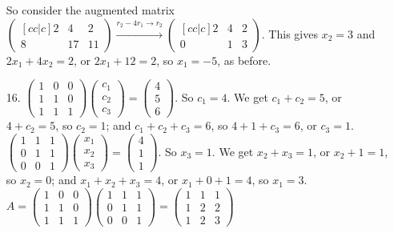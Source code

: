 \documentclass[11pt,twoside]{article}
\newcommand{\makearrow}[2]{\overset{#1}{\underset{#2}{\xrightarrow{\hspace{2cm}}}}}
\newcommand{\bpm}{\begin{pmatrix}}
\newcommand{\epm}{\end{pmatrix}}
\begin{document}
\begin{enumerate}
So consider the augmented matrix $\bpm[cc|c]2 & 4 & 2\\ 8 & 17 & 11 \epm \makearrow{r_2 - 4r_1 \rightarrow r_2}{} \bpm[cc|c] 2 & 4 & 2 \\ 0 & 1 & 3\epm$. This gives $x_2 =3$ and $2x_1+4x_2 = 2$, or $2x_1 + 12 = 2$, so $x_1 = -5$, as before.\\

\pagebreak

\item[16.] $\bpm 1&0&0 \\ 1&1&0 \\ 1&1&1\epm \bpm c_1\\ c_2\\ c_3\epm = \bpm 4 \\ 5 \\ 6 \epm$. So $c_1 =4$. We get $c_1 + c_2 = 5$, or $4 + c_2 = 5$, so $c_2 = 1$; and $c_1+c_2+c_3 = 6$, so $4 + 1 + c_3 = 6$, or $c_3=1$.\\

$\bpm 1  &  1 & 1\\ 0&1&1 \\ 0&0&1 \epm\bpm x_1 \\ x_2 \\ x_3 \epm =  \bpm 4\\1\\1\epm$. So $x_3 = 1$. We get $x_2+x_3 = 1$, or $x_2 + 1 = 1$, so $x_2 = 0$; and $x_1+x_2+x_3 = 4$, or $x_1 + 0 + 1 = 4$, so $x_1 =3$. \\

$A=\bpm 1&0&0 \\ 1&1&0 \\ 1&1&1\epm \bpm 1  &  1 & 1\\ 0&1&1 \\ 0&0&1 \epm = \bpm 1 & 1 & 1 \\ 1 & 2 & 2 \\ 1 & 2 & 3\epm$
\end{enumerate}
\end{document}
